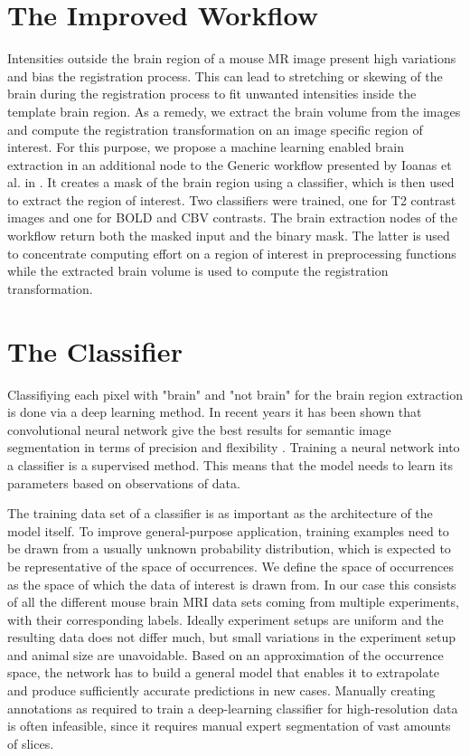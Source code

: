 \section{The Improved Workflow}

Intensities outside the brain region of a mouse MR image present high variations and bias the registration process.
This can lead to stretching or skewing of the brain during the registration process to fit unwanted intensities inside the template brain region.
As a remedy, we extract the brain volume from the images and compute the registration transformation on an image specific region of interest.
For this purpose, we propose a machine learning enabled brain extraction in an additional node to the Generic workflow presented by Ioanas et al. in \cite{ioanas_optimized_2019}.
It creates a mask of the brain region using a classifier, which is then used to extract the region of interest.
Two classifiers were trained, one for T2 contrast images and one for BOLD \cite{bold} and CBV \cite{cbv} contrasts.
The brain extraction nodes of the workflow return both the masked input and the binary mask.
The latter is used to concentrate computing effort on a region of interest in preprocessing functions while the extracted brain volume is used to compute the registration transformation.

\section{The Classifier} \label{sec:Convolutional Neural Networks}
Classifiying each pixel with "brain" and "not brain" for the brain region extraction is done via a deep learning method.
In recent years it has been shown that convolutional neural network give the best results for semantic image segmentation in terms of precision and flexibility \cite{geng_survey_2018, ronneberger_u-net:_2015}.
Training a neural network into a classifier is a supervised method.
This means that the model needs to learn its parameters based on observations of data.

The training data set of a classifier is as important as the architecture of the model itself.
To improve general-purpose application, training examples need to be drawn from a usually unknown probability distribution, which is expected to be representative of the space of occurrences.
We define the space of occurrences as the space of which the data of interest is drawn from.
In our case this consists of all the different mouse brain MRI data sets coming from multiple experiments, with their corresponding labels.
Ideally experiment setups are uniform and the resulting data does not differ much, but small variations in the experiment setup and animal size are unavoidable.
Based on an approximation of the occurrence space, the network has to build a general model that enables it to extrapolate and produce sufficiently accurate predictions in new cases.
Manually creating annotations as required to train a deep-learning classifier for high-resolution data is often infeasible, since it requires manual expert segmentation of vast amounts of slices.

